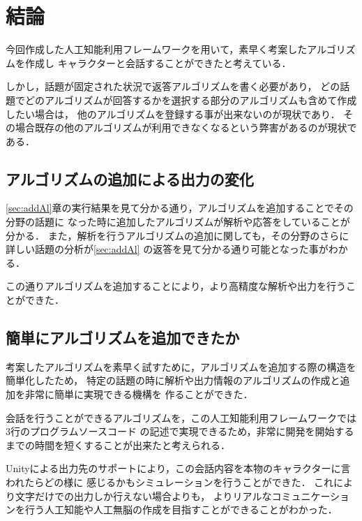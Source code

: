 \section{結論}
今回作成した人工知能利用フレームワークを用いて，素早く考案したアルゴリズムを作成し
キャラクターと会話することができたと考えている．

しかし，話題が固定された状況で返答アルゴリズムを書く必要があり，
どの話題でどのアルゴリズムが回答するかを選択する部分のアルゴリズムも含めて作成したい場合は，
他のアルゴリズムを登録する事が出来ないのが現状であり．
その場合既存の他のアルゴリズムが利用できなくなるという弊害があるのが現状である．

\subsection{アルゴリズムの追加による出力の変化}
\ref{sec:addAl}章の実行結果を見て分かる通り，アルゴリズムを追加することでその分野の話題に
なった時に追加したアルゴリズムが解析や応答をしていることが分かる．
また，解析を行うアルゴリズムの追加に関しても，その分野のさらに詳しい話題の分析が\ref{sec:addAl}
の返答を見て分かる通り可能となった事がわかる．

この通りアルゴリズムを追加することにより，より高精度な解析や出力を行うことができた．

\subsection{簡単にアルゴリズムを追加できたか}
考案したアルゴリズムを素早く試すために，アルゴリズムを追加する際の構造を簡単化したため，
特定の話題の時に解析や出力情報のアルゴリズムの作成と追加を非常に簡単に実現できる機構を
作ることができた．

会話を行うことができるアルゴリズムを，この人工知能利用フレームワークでは3行のプログラムソースコード
の記述で実現できるため，非常に開発を開始するまでの時間を短くすることが出来たと考えられる．

Unityによる出力先のサポートにより，この会話内容を本物のキャラクターに言われたらどの様に
感じるかもシミュレーションを行うことができた．
これにより文字だけでの出力しか行えない場合よりも，
よりリアルなコミュニケーションを行う人工知能や人工無脳の作成を目指すことができることがわかった．
